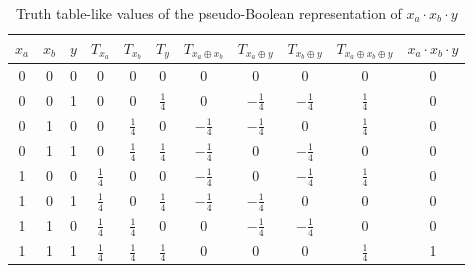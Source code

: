 \documentclass[a4paper]{article}
\begin{document}
\begin{table*}[h]
  \begin{minipage}{\textwidth}
    \begin{center}
      \scalebox{1.0} {
        \begin{tabular}{c|c|c|c|c|c|c|c|c|c|c}\hline
          $x_a$ & $x_b$ & $y$ & $T_{x_a}$         & $T_{x_b}$         & $T_{y}$         & $T_{x_a \oplus x_b}$ & $T_{x_a \oplus y}$ & $T_{x_b \oplus y}$ & $T_{x_a \oplus x_b \oplus y}$ & $x_a \cdot x_b \cdot y$\\\hline
          0     & 0     & 0   & 0                 & 0                 & 0               & 0                    & 0                  & 0                  & 0                             & 0            \\\hline
          0     & 0     & 1   & 0                 & 0                 & $\frac{1}{4}$   & 0                    & $-\frac{1}{4}$     & $-\frac{1}{4}$     & $\frac{1}{4}$                 & 0            \\\hline
          0     & 1     & 0   & 0                 & $\frac{1}{4}$     & 0               & $-\frac{1}{4}$       & $-\frac{1}{4}$     & 0                  & $\frac{1}{4}$                 & 0            \\\hline
          0     & 1     & 1   & 0                 & $\frac{1}{4}$     & $\frac{1}{4}$   & $-\frac{1}{4}$       & 0                  & $-\frac{1}{4}$     & 0                             & 0            \\\hline
          1     & 0     & 0   & $\frac{1}{4}$     & 0                 & 0               & $-\frac{1}{4}$       & 0                  & $-\frac{1}{4}$     & $\frac{1}{4}$                 & 0            \\\hline
          1     & 0     & 1   & $\frac{1}{4}$     & 0                 & $\frac{1}{4}$   & $-\frac{1}{4}$       & $-\frac{1}{4}$     & 0                  & 0                             & 0            \\\hline
          1     & 1     & 0   & $\frac{1}{4}$     & $\frac{1}{4}$     & 0               & 0                    & $-\frac{1}{4}$     & $-\frac{1}{4}$     & 0                             & 0            \\\hline
          1     & 1     & 1   & $\frac{1}{4}$     & $\frac{1}{4}$     & $\frac{1}{4}$   & 0                    & 0                  & 0                  & $\frac{1}{4}$                 & 1            \\\hline
        \end{tabular}
      }
      \caption{Truth table-like values of the pseudo-Boolean representation of $x_a \cdot x_b \cdot y$}
      \label{table-pseudo-toff}
    \end{center}
  \end{minipage}
\end{table*}
\end{document}
